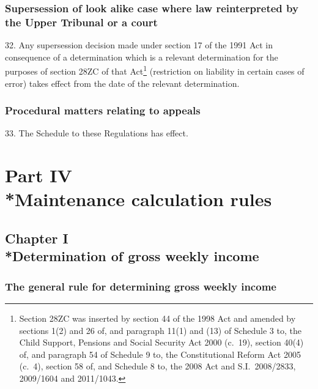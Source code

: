 \documentclass[12pt,a4paper]{article}
\begin{document}
\subsubsection[32. Supersession of look alike case where law reinterpreted by the Upper Tribunal or a court]{Supersession of look alike case where law reinterpreted by the Upper Tribunal or a court}

32.  Any supersession decision made under section 17 of the 1991 Act in consequence of a determination which is a relevant determination for the purposes of section 28ZC of that Act\footnote{Section 28ZC was inserted by section 44 of the 1998 Act and amended by sections 1(2) and 26 of, and paragraph 11(1) and (13) of Schedule 3 to, the Child Support, Pensions and Social Security Act 2000 (c.~19), section 40(4) of, and paragraph 54 of Schedule 9 to, the Constitutional Reform Act 2005 (c.~4), section 58 of, and Schedule 8 to, the 2008 Act and S.I.~2008/2833, 2009/1604 and 2011/1043.} (restriction on liability in certain cases of error) takes effect from the date of the relevant determination.

\subsubsection[33. Procedural matters relating to appeals]{Procedural matters relating to appeals}

33.  The Schedule to these Regulations has effect.

\section[Part IV --- Maintenance calculation rules]{Part IV\\*Maintenance calculation rules}

\subsection[Chapter I --- Determination of gross weekly income]{Chapter I\\*Determination of gross weekly income}

\renewcommand\parthead{--- Part IV Chapter I}

\subsubsection[34. The general rule for determining gross weekly income]{The general rule for determining gross weekly income}
\end{document}
